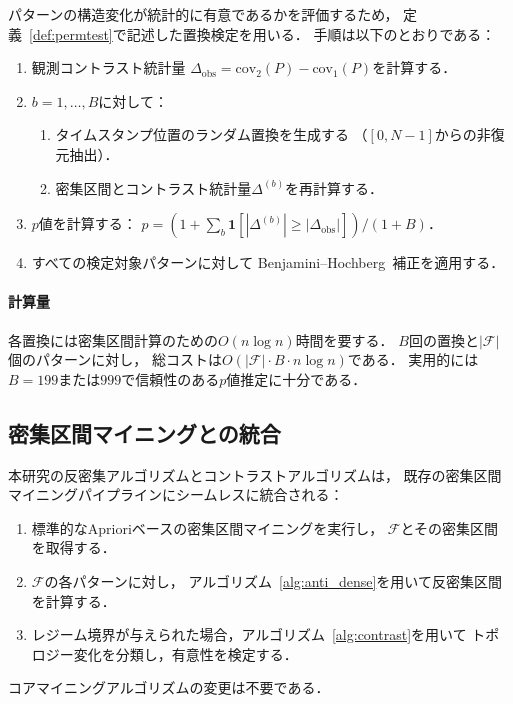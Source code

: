 パターンの構造変化が統計的に有意であるかを評価するため，
定義~\ref{def:permtest}で記述した置換検定を用いる．
手順は以下のとおりである：

\begin{enumerate}
\item 観測コントラスト統計量
  $\Delta_{\text{obs}} = \text{cov}_2(P) - \text{cov}_1(P)$を計算する．
\item $b = 1, \ldots, B$に対して：
  \begin{enumerate}
  \item タイムスタンプ位置のランダム置換を生成する
    （$[0, N-1]$からの非復元抽出）．
  \item 密集区間とコントラスト統計量$\Delta^{(b)}$を再計算する．
  \end{enumerate}
\item $p$値を計算する：
  $p = (1 + \sum_{b} \mathbf{1}[|\Delta^{(b)}| \geq |\Delta_{\text{obs}}|]) / (1 + B)$．
\item すべての検定対象パターンに対して
  Benjamini--Hochberg~\cite{benjamini1995fdr}補正を適用する．
\end{enumerate}

\paragraph{計算量}
各置換には密集区間計算のための$O(n \log n)$時間を要する．
$B$回の置換と$|\mathcal{F}|$個のパターンに対し，
総コストは$O(|\mathcal{F}| \cdot B \cdot n \log n)$である．
実用的には$B = 199$または$999$で信頼性のある$p$値推定に十分である．

\subsection{密集区間マイニングとの統合}

本研究の反密集アルゴリズムとコントラストアルゴリズムは，
既存の密集区間マイニングパイプラインにシームレスに統合される：
\begin{enumerate}
\item 標準的なAprioriベースの密集区間マイニングを実行し，
  $\mathcal{F}$とその密集区間を取得する．
\item $\mathcal{F}$の各パターンに対し，
  アルゴリズム~\ref{alg:anti_dense}を用いて反密集区間を計算する．
\item レジーム境界が与えられた場合，アルゴリズム~\ref{alg:contrast}を用いて
  トポロジー変化を分類し，有意性を検定する．
\end{enumerate}
コアマイニングアルゴリズムの変更は不要である．

